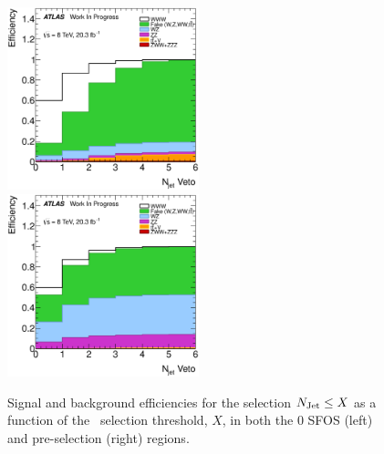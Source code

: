 \begin{figure}[ht!]
\centering
\includegraphics[width=0.495\textwidth]{figures/optimization/SignalRegionsPreselection_0SFOS_Efficiencies/NJets_LeftCumulative.eps}
\includegraphics[width=0.495\textwidth]{figures/optimization/SignalRegions_0p5mmZ0_Preselection_Efficiencies/NJets_LeftCumulative.eps}
\caption{ Signal and background efficiencies for the selection
$N_{\textrm{Jet}} \leq X$ as a function of the \njet~selection
threshold, $X$, in both the 0 SFOS (left) and pre-selection (right) regions.  }
\label{fig:njet_eff}
\end{figure}

